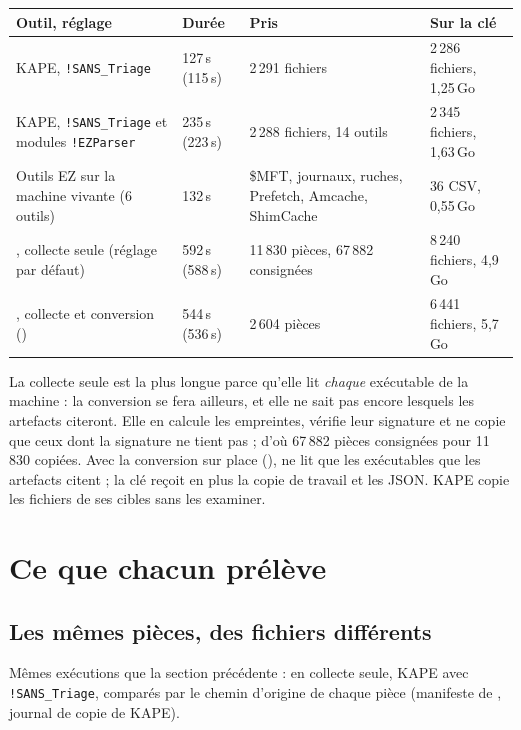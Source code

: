 \documentclass[11pt,a4paper,oneside]{report}
\begin{document}
\begin{longtable}{@{}L{5.6cm}L{2.6cm}L{3.4cm}L{3.4cm}@{}}
\toprule
\textbf{Outil, réglage} & \textbf{Durée} & \textbf{Pris} & \textbf{Sur la clé} \\
\midrule\endhead
KAPE, \texttt{!SANS\_Triage} & 127\,s (115\,s) & 2\,291 fichiers & 2\,286 fichiers, 1,25\,Go \\
KAPE, \texttt{!SANS\_Triage} et modules \texttt{!EZParser} & 235\,s (223\,s) & 2\,288 fichiers, 14 outils & 2\,345 fichiers, 1,63\,Go \\
Outils EZ sur la machine vivante (6 outils) & 132\,s & \$MFT, journaux, ruches, Prefetch, Amcache, ShimCache & 36 CSV, 0,55\,Go \\
\wac{}, collecte seule (réglage par défaut) & 592\,s (588\,s) & 11\,830 pièces, 67\,882 consignées & 8\,240 fichiers, 4,9\,Go \\
\wac{}, collecte et conversion () & 544\,s (536\,s) & 2\,604 pièces & 6\,441 fichiers, 5,7\,Go \\
\bottomrule
\end{longtable}

La collecte seule est la plus longue parce qu'elle lit \emph{chaque} exécutable
de la machine : la conversion se fera ailleurs, et elle ne sait pas encore
lesquels les artefacts citeront. Elle en calcule les empreintes, vérifie leur
signature et ne copie que ceux dont la signature ne tient pas ; d'où 67\,882
pièces consignées pour 11\,830 copiées. Avec la conversion sur place
(), \wac{} ne lit que les exécutables que les artefacts citent ; la
clé reçoit en plus la copie de travail et les JSON. KAPE copie les fichiers de
ses cibles sans les examiner.

\chapter{Ce que chacun prélève}\label{chap:prelevement}

\section{Les mêmes pièces, des fichiers différents}

Mêmes exécutions que la section précédente : \wac{} en collecte seule, KAPE
avec \texttt{!SANS\_Triage}, comparés par le chemin d'origine de chaque pièce
(manifeste de \wac{}, journal de copie de KAPE).
\end{document}
